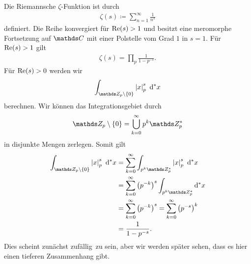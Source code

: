Die Riemannsche $\zeta$-Funktion ist durch
\begin{align*}
\zeta(s)\coloneqq \sum_{n=1}^\infty \frac{1}{n^s}
\end{align*}
definiert.
Die Reihe konvergiert für $\operatorname{Re}(s)>1$ und besitzt eine meromorphe Fortsetzung auf $\C$ mit einer Polstelle vom Grad $1$ in $s=1$.
Für $\operatorname{Re}(s)>1$ gilt
\begin{align*}
\zeta(s)=\prod_p \frac{1}{1-p^{-s}}.
\end{align*}
Für $\operatorname{Re}(s)>0$ werden wir
\begin{align*}
\int_{\Z_p \setminus \{0\}} \abs{x}_p^s ~\mathrm{d}^\ast x
\end{align*}
berechnen.
Wir können das Integrationsgebiet durch
\begin{align*}
\Z_p\setminus \{0\}=\bigcup_{k=0}^\infty p^k \Z_p^\ast
\end{align*}
in disjunkte Mengen zerlegen.
Somit gilt
\begin{align*}
\int_{\Z_p \setminus \{0\}} \abs{x}_p^s ~\mathrm{d}^\ast x&=\sum_{k=0}^\infty \int_{p^k \Z_p^\ast} \abs{x}_p^s ~\mathrm{d}^\ast x\\
&=\sum_{k=0}^\infty \left(p^{-k}\right)^s \int_{p^k \Z_p^\ast}\mathrm{d}^\ast x \\
&=\sum_{k=0}^\infty \left(p^{-k}\right)^s=\sum_{k=0}^\infty \left(p^{-s}\right)^k\\
&=\frac{1}{1-p^{-s}}.
\end{align*}
Dies scheint zunächst \glqq zufällig\grqq\, zu sein, aber wir werden später sehen, dass es hier einen tieferen Zusammenhang gibt.